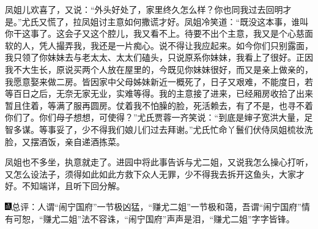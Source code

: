 凤姐儿欢喜了，又说：“外头好处了，家里终久怎么样？你也同我过去回明才是。”尤氏又慌了，拉凤姐讨主意如何撒谎才好。凤姐冷笑道：“既没这本事，谁叫你干这事了。这会子又这个腔儿，我又看不上。待要不出个主意，我又是个心慈面软的人，凭人撮弄我，我还是一片痴心。说不得让我应起来。如今你们只别露面，我只领了你妹妹去与老太太、太太们磕头，只说原系你妹妹，我看上了很好。正因我不大生长，原说买两个人放在屋里的，今既见你妹妹很好，而又是亲上做亲的，我愿意娶来做二房。皆因家中父母姊妹新近一概死了，日子又艰难，不能度日，若等百日之后，无奈无家无业，实难等得。我的主意接了进来，已经厢房收拾了出来暂且住着，等满了服再圆房。仗着我不怕臊的脸，死活赖去，有了不是，也寻不着你们了。你们母子想想，可使得？”尤氏贾蓉一齐笑说：“到底是婶子宽洪大量，足智多谋。等事妥了，少不得我们娘儿们过去拜谢。”尤氏忙命丫鬟们伏侍凤姐梳妆洗脸，又摆酒饭，亲自递酒拣菜。

凤姐也不多坐，执意就走了。进园中将此事告诉与尤二姐，又说我怎么操心打听，又怎么设法子，须得如此如此方救下众人无罪，少不得我去拆开这鱼头，大家才好。不知端详，且听下回分解。

{\includegraphics[width=3mm]{../Images/00005}\kaishu 总评：人谓“闹宁国府”一节极凶猛，“赚尤二姐”一节极和蔼，吾谓“闹宁国府”情有可恕，“赚尤二姐”法不容诛，“闹宁国府”声声是泪，“赚尤二姐”字字皆锋。}
